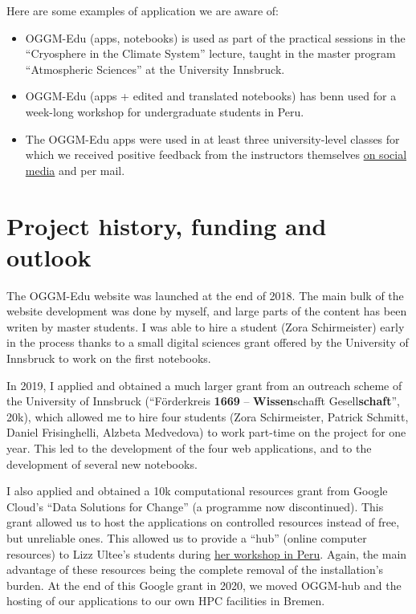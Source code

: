 Here are some examples of application we are aware of:
\begin{itemize}[nosep]
\item {} 
OGGM-Edu (apps, notebooks) is used as part of the practical sessions in the “Cryosphere in the Climate System”
lecture, taught in the master program “Atmospheric Sciences” at the University Innsbruck.

\item {} 
OGGM-Edu (apps + edited and translated notebooks) has benn used for a week-long workshop for undergraduate students
in Peru.

\item {} 
The OGGM-Edu apps were used in at least three university-level classes for which we received positive feedback from
the instructors themselves \href{https://twitter.com/iceclimate/status/1359280232990199809}{on social media} and per mail.

\end{itemize}


\section{Project history, funding and outlook}

The OGGM-Edu website was launched at the end of 2018. The main bulk of the website development was done by myself,
and large parts of the content has been writen by master students. I was able to hire a student (Zora Schirmeister)
early in the process thanks to  a small digital sciences grant offered by the University of Innsbruck to work on the
first notebooks.

In 2019, I applied and obtained a much larger grant from an outreach scheme of the University of Innsbruck
(“Förderkreis \textbf{1669} -- \textbf{Wissen}schafft Gesell\textbf{schaft}”, 20k\texteuro{}),
which allowed me to hire four students (Zora Schirmeister, Patrick Schmitt, Daniel Frisinghelli, Alzbeta Medvedova)
to work part-time on the project for one year. This led to the development of the four web applications,
and to the development of several new notebooks.

I also applied and obtained a 10k\texteuro{} computational resources grant from Google Cloud’s “Data Solutions for Change”
(a programme now discontinued). This grant allowed us to host the applications on controlled resources instead of free,
but unreliable ones. This allowed us to provide a “hub” (online computer resources) to Lizz Ultee’s students during
\href{https://oggm.org/2019/12/06/OGGM-Edu-AGU/}{her workshop in Peru}. Again, the main advantage of these resources
being the complete removal of the installation’s burden. At the end of this Google grant in 2020, we moved OGGM-hub
and the hosting of our applications to our own HPC facilities in Bremen.

